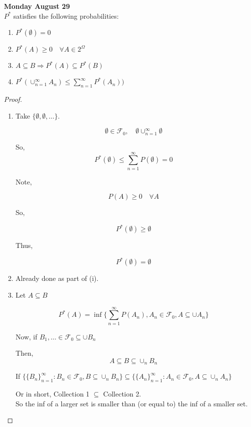 \documentclass[11pt,fleqn]{book} %
\begin{document}
\textbf{Monday August 29}\\

$P^*$ satisfies the following probabilities:

\begin{enumerate}[label = (\roman*)]
	\item $P^*(\emptyset) = 0$
	\item $P^*(A) \geq 0 \quad \forall A \in 2^\Omega$
	\item $A \subseteq B \Rightarrow P^*(A) \subseteq P^*(B)$
	\item $P^*(\cup^\infty_{n=1} A_n) \leq \displaystyle \sum^\infty_{n=1} P^*(A_n))$
\end{enumerate}

\begin{proof}
	
	\begin{enumerate}[label = (\roman*)]
		\item Take $\{\emptyset, \emptyset, \dots \}$. 

		$$\emptyset \in \mathscr{F}_0, \quad \emptyset \cup^\infty_{n=1} \emptyset $$

		So, \\
		$$P^*(\emptyset) \leq \displaystyle \sum^\infty_{n=1} P(\emptyset) = 0$$

		Note,

		$$P(A) \geq 0 \quad \forall A$$

		So, 

		$$P^*(\emptyset) \geq \emptyset$$ 

		Thus,

		 $$P^*(\emptyset) = \emptyset$$
		\item  Already done as part of (i).

		\item  Let $A \subseteq B$

		$$P^*(A) = \inf\{\displaystyle \sum^\infty_{n=1} P(A_n), A_n \in \mathscr{F}_0, A \subseteq \cup A_n \} $$

		Now, if $B_1, \dots \in \mathscr{F}_0 \subseteq \cup B_n$

		Then, 
		$$A \subseteq B \subseteq \cup_n B_n $$

		If  $\{ \{B_n\}^\infty_{n=1}: B_n \in \mathscr{F}_0, B \subseteq \cup_n B_n \} \subseteq \{ \{A_n\}^\infty_{n=1}: A_n \in \mathscr{F}_0, A \subseteq \cup_n A_n \}$

		Or in short, Collection 1 $\subseteq$ Collection 2.\\

		So the inf of a larger set is smaller than (or equal to) the inf of a smaller set.\\
		

\end{enumerate}
\end{proof}
\end{document}
